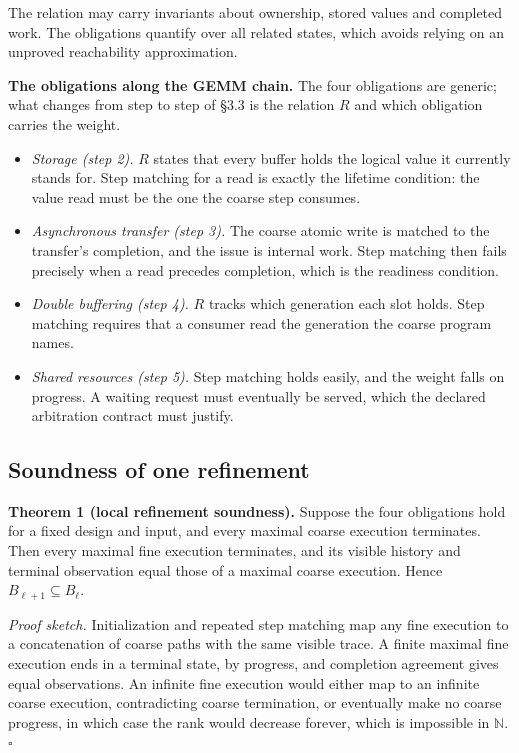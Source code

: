 \documentclass[11pt]{article}
\providecommand{\tightlist}{\setlength{\itemsep}{0pt}\setlength{\parskip}{0pt}}
\begin{document}
The relation may carry invariants about ownership, stored values and completed work. The obligations quantify over all related states, which avoids relying on an unproved reachability approximation.

\textbf{The obligations along the GEMM chain.} The four obligations are generic; what changes from step to step of §3.3 is the relation \(R\) and which obligation carries the weight.

\begin{itemize}
\tightlist
\item
  \emph{Storage (step 2).} \(R\) states that every buffer holds the logical value it currently stands for. Step matching for a read is exactly the lifetime condition: the value read must be the one the coarse step consumes.
\item
  \emph{Asynchronous transfer (step 3).} The coarse atomic write is matched to the transfer's completion, and the issue is internal work. Step matching then fails precisely when a read precedes completion, which is the readiness condition.
\item
  \emph{Double buffering (step 4).} \(R\) tracks which generation each slot holds. Step matching requires that a consumer read the generation the coarse program names.
\item
  \emph{Shared resources (step 5).} Step matching holds easily, and the weight falls on progress. A waiting request must eventually be served, which the declared arbitration contract must justify.
\end{itemize}

\hypertarget{soundness-of-one-refinement}{%
\subsection{Soundness of one refinement}\label{soundness-of-one-refinement}}

\textbf{Theorem 1 (local refinement soundness).} Suppose the four obligations hold for a fixed design and input, and every maximal coarse execution terminates. Then every maximal fine execution terminates, and its visible history and terminal observation equal those of a maximal coarse execution. Hence \(B_{\ell+1}\subseteq B_\ell\).

\emph{Proof sketch.} Initialization and repeated step matching map any fine execution to a concatenation of coarse paths with the same visible trace. A finite maximal fine execution ends in a terminal state, by progress, and completion agreement gives equal observations. An infinite fine execution would either map to an infinite coarse execution, contradicting coarse termination, or eventually make no coarse progress, in which case the rank would decrease forever, which is impossible in \(\mathbb N\). \(\square\)
\end{document}
